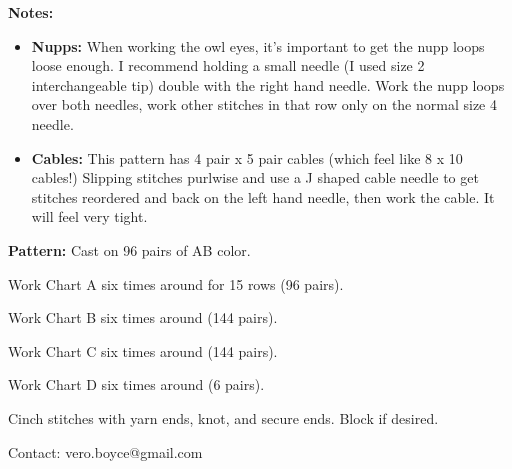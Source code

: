 \documentclass[11pt]{article}
\begin{document}
\smallskip
\textbf{Notes:}
\begin{itemize}
	\item \textbf{Nupps:} When working the owl eyes, it's important to get the nupp loops loose enough. I recommend holding a small needle (I used size 2 interchangeable tip) double with the right hand needle. Work the nupp loops over both needles, work other stitches in that row only on the normal size 4 needle. 
	\item \textbf{Cables:} This pattern has 4 pair x 5 pair cables (which feel like 8 x 10 cables!) Slipping stitches purlwise and use a J shaped cable needle to get stitches reordered and back on the left hand needle, then work the cable. It will feel very tight. 
\end{itemize}

\smallskip

\textbf{Pattern:}
Cast on 96 pairs of AB color. 

Work Chart A six times around for 15 rows (96 pairs). 

Work Chart B six times around (144 pairs). 

Work Chart C six times around (144 pairs). 

Work Chart D six times around (6 pairs). 

Cinch stitches with yarn ends, knot, and secure ends. Block if desired. 


\doclicenseThis
Contact: vero.boyce@gmail.com

\newpage

\end{document}
